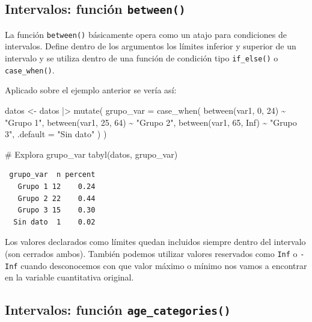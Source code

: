 \documentclass[
  spanish,
  a4paper,
]{scrbook}
\newenvironment{Shaded}{\begin{snugshade}}{\end{snugshade}}
\newcommand{\AttributeTok}[1]{\textcolor[rgb]{0.40,0.45,0.13}{#1}}
\newcommand{\CommentTok}[1]{\textcolor[rgb]{0.37,0.37,0.37}{#1}}
\newcommand{\ConstantTok}[1]{\textcolor[rgb]{0.56,0.35,0.01}{#1}}
\newcommand{\DecValTok}[1]{\textcolor[rgb]{0.68,0.00,0.00}{#1}}
\newcommand{\FunctionTok}[1]{\textcolor[rgb]{0.28,0.35,0.67}{#1}}
\newcommand{\NormalTok}[1]{\textcolor[rgb]{0.00,0.23,0.31}{#1}}
\newcommand{\OtherTok}[1]{\textcolor[rgb]{0.00,0.23,0.31}{#1}}
\newcommand{\SpecialCharTok}[1]{\textcolor[rgb]{0.37,0.37,0.37}{#1}}
\newcommand{\StringTok}[1]{\textcolor[rgb]{0.13,0.47,0.30}{#1}}
\begin{document}
\subsection{\texorpdfstring{Intervalos: función
\textbf{\texttt{between()}}}{Intervalos: función between()}}\label{intervalos-funciuxf3n-between}

La función \texttt{between()} básicamente opera como un atajo para
condiciones de intervalos. Define dentro de los argumentos los límites
inferior y superior de un intervalo y se utiliza dentro de una función
de condición tipo \texttt{if\_else()} o \texttt{case\_when()}.

Aplicado sobre el ejemplo anterior se vería así:

\begin{Shaded}
\begin{Highlighting}[]
\NormalTok{datos }\OtherTok{\textless{}{-}}\NormalTok{ datos }\SpecialCharTok{|\textgreater{}}
  \FunctionTok{mutate}\NormalTok{(}
    \AttributeTok{grupo\_var =} \FunctionTok{case\_when}\NormalTok{(}
      \FunctionTok{between}\NormalTok{(var1, }\DecValTok{0}\NormalTok{, }\DecValTok{24}\NormalTok{) }\SpecialCharTok{\textasciitilde{}} \StringTok{"Grupo 1"}\NormalTok{,}
      \FunctionTok{between}\NormalTok{(var1, }\DecValTok{25}\NormalTok{, }\DecValTok{64}\NormalTok{) }\SpecialCharTok{\textasciitilde{}} \StringTok{"Grupo 2"}\NormalTok{,}
      \FunctionTok{between}\NormalTok{(var1, }\DecValTok{65}\NormalTok{, }\ConstantTok{Inf}\NormalTok{) }\SpecialCharTok{\textasciitilde{}} \StringTok{"Grupo 3"}\NormalTok{,}
      \AttributeTok{.default =} \StringTok{"Sin dato"}
\NormalTok{    )}
\NormalTok{  )}

\CommentTok{\# Explora grupo\_var}
\FunctionTok{tabyl}\NormalTok{(datos, grupo\_var)}
\end{Highlighting}
\end{Shaded}

\begin{verbatim}
 grupo_var  n percent
   Grupo 1 12    0.24
   Grupo 2 22    0.44
   Grupo 3 15    0.30
  Sin dato  1    0.02
\end{verbatim}

Los valores declarados como límites quedan incluidos siempre dentro del
intervalo (son cerrados ambos). También podemos utilizar valores
reservados como \texttt{Inf} o \texttt{-Inf} cuando desconocemos con que
valor máximo o mínimo nos vamos a encontrar en la variable cuantitativa
original.

\subsection{\texorpdfstring{Intervalos: función
\texttt{age\_categories()}}{Intervalos: función age\_categories()}}\label{intervalos-funciuxf3n-age_categories}
\end{document}
